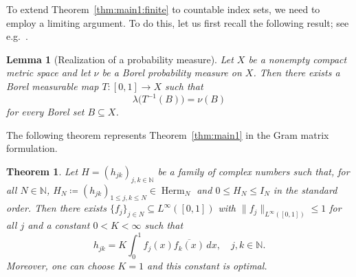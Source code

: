 \documentclass[reqno,a4paper,12pt]{amsart}
\numberwithin{equation}{section}
\newtheorem{theorem}[definition]{Theorem}
\newtheorem{lemma}[definition]{Lemma}
\def\N{{\mathbb N}}
\newcommand\1{\mathds{1}}
\DeclareMathOperator{\herm}{Herm}
\begin{document}
To extend Theorem~\ref{thm:main1:finite} to countable index sets, we need to employ a limiting argument. To do this, let us first recall the following result; see e.g.~\cite[Thm.~3.2]{billingsley1971}.
\begin{lemma}[Realization of a probability measure]
\label{lem:probability_realization}
Let $X$ be a nonempty compact metric space and let $\nu$ be a Borel
probability measure on $X$. Then there exists a Borel measurable map
$T:[0,1]\to X$ such that
\[
\lambda\bigl(T^{-1}(B)\bigr)=\nu(B)
\]
for every Borel set $B\subseteq X$.
\end{lemma}
The following theorem represents Theorem~\ref{thm:main1} in the Gram matrix formulation.
\begin{theorem}\label{thm:countable_gram_realization}
    Let $H=(h_{jk})_{j,k\in \N}$ be a family of complex numbers such that, for all $N\in \N$, $H_N\coloneqq(h_{jk})_{1\leq j,k\leq N}\in \herm_N$ and $0\le H_N\le I_N$ in the standard order. Then there exists $\{ f_j \}_{j\in N} \subseteq L^\infty([0,1])$ with $\| f_j \|_{L^\infty([0,1])} \leq 1$ for all $j$ and a constant $0 <K< \infty$ such that
    \begin{equation}
        h_{jk} = K \int_0^1 f_j(x) \overline{f_k(x)} \, dx, \quad j,k \in \N.
    \end{equation}
    Moreover, one can choose $K=1$ and this constant is optimal.
\end{theorem}
\end{document}
